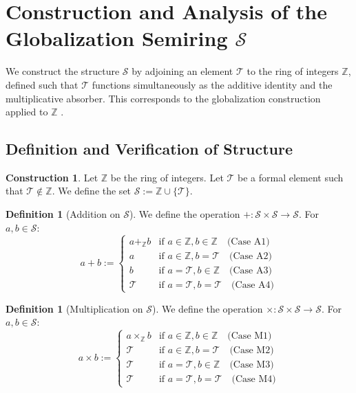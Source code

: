 \documentclass[11pt, a4paper]{article}
\theoremstyle{plain}
\theoremstyle{definition}
\newtheorem{definition}[theorem]{Definition}
\newtheorem{construction}[theorem]{Construction}
\numberwithin{equation}{section}
\newcommand{\Z}{\mathbb{Z}}
\newcommand{\Tobj}{\mathcal{T}} %
\newcommand{\SemiringS}{\mathcal{S}}
\begin{document}
\section{Construction and Analysis of the Globalization Semiring $\SemiringS$}

We construct the structure $\SemiringS$ by adjoining an element $\Tobj$ to the ring of integers $\Z$, defined such that $\Tobj$ functions simultaneously as the additive identity and the multiplicative absorber. This corresponds to the globalization construction applied to $\Z$ \cite[Example I.1.10]{GolanSemirings}.

\subsection{Definition and Verification of Structure}

\begin{construction}\label{const:S}
Let $\Z$ be the ring of integers. Let $\Tobj$ be a formal element such that $\Tobj \notin \Z$. We define the set $\SemiringS := \Z \cup \{\Tobj\}$.
\end{construction}

\begin{definition}[Addition on $\SemiringS$]\label{def:addition_S}
We define the operation $+: \SemiringS \times \SemiringS \to \SemiringS$. For $a, b \in \SemiringS$:
\begin{equation}
a+b := \begin{cases}
    a+_{\Z} b & \text{if } a \in \Z, b \in \Z \quad \text{(Case A1)} \\
    a & \text{if } a \in \Z, b = \Tobj \quad \text{(Case A2)} \\
    b & \text{if } a = \Tobj, b \in \Z \quad \text{(Case A3)} \\
    \Tobj & \text{if } a = \Tobj, b = \Tobj \quad \text{(Case A4)}
\end{cases}
\end{equation}
\end{definition}

\begin{definition}[Multiplication on $\SemiringS$]\label{def:multiplication_S}
We define the operation $\times: \SemiringS \times \SemiringS \to \SemiringS$. For $a, b \in \SemiringS$:
\begin{equation}
a\times b := \begin{cases}
    a\times_{\Z} b & \text{if } a \in \Z, b \in \Z \quad \text{(Case M1)} \\
    \Tobj & \text{if } a \in \Z, b = \Tobj \quad \text{(Case M2)} \\
    \Tobj & \text{if } a = \Tobj, b \in \Z \quad \text{(Case M3)} \\
    \Tobj & \text{if } a = \Tobj, b = \Tobj \quad \text{(Case M4)}
\end{cases}
\end{equation}
\end{definition}
\end{document}
